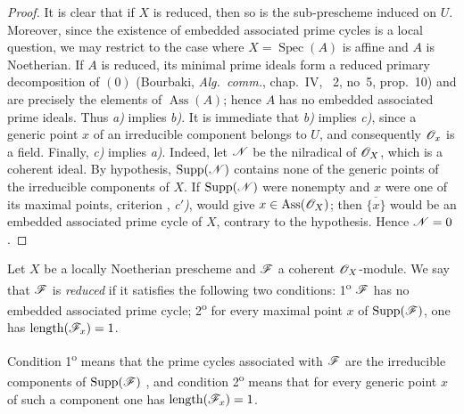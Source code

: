 \begin{proof}
It is clear that if $X$ is reduced, then so is the sub-prescheme induced on $U$.
Moreover, since the existence of embedded associated prime cycles is a local question, we may restrict to the case where $X=\operatorname{Spec}(A)$ is affine and $A$ is Noetherian.
If $A$ is reduced, its minimal prime ideals form a reduced primary decomposition of $(0)$ (Bourbaki, \emph{Alg.\ comm.}, chap.~IV, \textsection~2, no~5, prop.~10) and are precisely the elements of $\operatorname{Ass}(A)$; hence $A$ has no embedded associated prime ideals.  Thus \emph{a)} implies \emph{b)}.
It is immediate that \emph{b)} implies \emph{c)}, since a generic point $x$ of an irreducible component belongs to $U$, and consequently $\mathscr{O}_x$ is a field.
Finally, \emph{c)} implies \emph{a)}.  Indeed, let $\mathscr{N}$ be the nilradical of $\mathscr{O}_X$, which is a coherent ideal.  By hypothesis, $\operatorname{Supp}(\mathscr{N})$ contains none of the generic points of the irreducible components of $X$.  If $\operatorname{Supp}(\mathscr{N})$ were nonempty and $x$ were one of its maximal points, criterion , \emph{c$'$)}, would give $x\in\operatorname{Ass}(\mathscr{O}_X)$; then $\overline{\{x\}}$ would be an embedded associated prime cycle of $X$, contrary to the hypothesis.  Hence $\mathscr{N}=0$.
\end{proof}

\begin{definition}[3.2.2]
\label{IV.3.2.2}
Let $X$ be a locally Noetherian prescheme and $\mathscr{F}$ a coherent $\mathscr{O}_X$-module.
We say that $\mathscr{F}$ is \emph{reduced} if it satisfies the following two conditions: 1\textsuperscript{o} $\mathscr{F}$ has no embedded associated prime cycle; 2\textsuperscript{o} for every maximal point $x$ of $\operatorname{Supp}(\mathscr{F})$, one has $\operatorname{length}(\mathscr{F}_x)=1$.
\end{definition}

Condition 1\textsuperscript{o} means that the prime cycles associated with $\mathscr{F}$ are the irreducible components of $\operatorname{Supp}(\mathscr{F})$ , and condition 2\textsuperscript{o} means that for every generic point $x$ of such a component one has $\operatorname{length}(\mathscr{F}_x)=1$.


